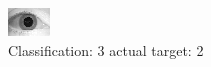 \begin{figure}[h!]
\begin{center}
\includegraphics[width=0.60\columnwidth]{figures/ID1609_class_3_target_2.png}
\end{center}
\caption{ Classification: 3 actual target: 2}
\label{fig:ID1609_class_3_target_2}
\end{figure}
